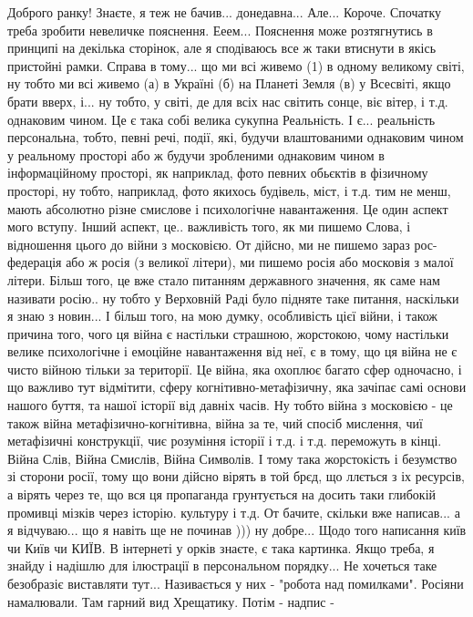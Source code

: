 Доброго ранку! Знаєте, я теж не бачив... донедавна... Але... Короче. Спочатку
треба зробити невеличке пояснення. Ееем... Пояснення може розтягнутись в
принципі на декілька сторінок, але я сподіваюсь все ж таки втиснути в якісь
пристойні рамки. Справа в тому... що ми всі живемо (1) в одному великому світі,
ну тобто ми всі живемо (а) в Україні (б) на Планеті Земля (в) у Всесвіті, якщо
брати вверх, і... ну тобто, у світі, де для всіх нас світить сонце, віє вітер,
і т.д. однаковим чином. Це є така собі велика сукупна Реальність. І є...
реальність персональна, тобто, певні речі, події, які, будучи влаштованими
однаковим чином у реальному просторі або ж будучи зробленими однаковим чином в
інформаційному просторі, як наприклад, фото певних обьєктів в фізичному
просторі, ну тобто, наприклад, фото якихось будівель, міст, і т.д. тим не менш,
мають абсолютно різне смислове і психологічне навантаження. Це один аспект мого
вступу. Інший аспект, це.. важливість того, як ми пишемо Слова, і відношення
цього до війни з московією. От дійсно, ми не пишемо зараз рос-федерація або ж
росія (з великої літери), ми пишемо росія або московія з малої літери. Більш
того, це вже стало питанням державного значення, як саме нам називати росію..
ну тобто у Верховній Раді було підняте таке питання, наскільки я знаю з
новин... І більш того, на мою думку, особливість цієї війни, і також причина
того, чого ця війна є настільки страшною, жорстокою, чому настільки велике
психологічне і емоційне навантаження від неї, є в тому, що ця війна не є чисто
війною тільки за території. Це війна, яка охоплює багато сфер одночасно, і що
важливо тут відмітити, сферу когнітивно-метафізичну, яка зачіпає самі основи
нашого буття, та нашої історії від давніх часів. Ну тобто війна з московією -
це також війна метафізично-когнітивна, війна за те, чий спосіб мислення, чиї
метафізичні конструкції, чиє розуміння історії і т.д. і т.д. переможуть в
кінці. Війна Слів, Війна Смислів, Війна Символів. І тому така жорстокість і
безумство зі сторони росії, тому що вони дійсно вірять в той брєд, що ллється з
іх ресурсів, а вірять через те, що вся ця пропаганда грунтується на досить таки
глибокій промивці мізків через історію. культуру і т.д. От бачите, скільки вже
написав... а я відчуваю... що я навіть ще не починав ))) ну добре... Щодо того
написання київ чи Київ чи КИЇВ. В інтернеті у орків знаєте, є така картинка.
Якщо треба, я знайду і надішлю для ілюстрації в персональном порядку... Не
хочеться таке безобразіє виставляти тут... Називається у них - "робота над
помилками". Росіяни намалювали. Там гарний вид Хрещатику. Потім - надпис -
